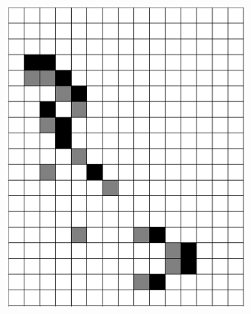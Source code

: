 \documentclass[12pt]{article}
\numberwithin{figure}{section} %
\begin{document}
\begin{figure}[H]
\begin{subfigure}{0.3\textwidth}
     \subcaption{}
   \end{subfigure}
   
   \begin{subfigure}{0.3\textwidth}
     \centering
     \includegraphics[width=\linewidth]{Section4/29.6}
     \subcaption{}
   \end{subfigure}
     \begin{subfigure}{0.3\textwidth}
     \centering

\end{subfigure}
\end{figure}
\end{document}
